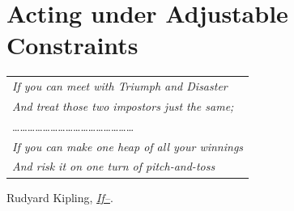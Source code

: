 
\graphicspath{{2-Chapters/5-Chapter/}}

\chapter{Acting under Adjustable Constraints}
\label{chapter:5}

\begin{flushright}
	\begin{tabular}{@{}l@{}}
		\emph{If you can meet with Triumph and Disaster}\\
		\emph{And treat those two impostors just the same;}\\
		\dots\dots\dots\dots\dots\dots\dots\dots\dots\dots\dots\dots\dots\dots\dots\dots\\
		\emph{If you can make one heap of all your winnings}\\
		\emph{And risk it on one turn of pitch-and-toss}\\
	\end{tabular}

	Rudyard Kipling, \href{https://eleurent.github.io/sisyphe/texts/if-.html}{\emph{If--}}.
\end{flushright}

%

